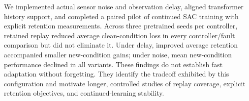 We implemented actual sensor noise and observation delay, aligned transformer history support, and completed a paired pilot of continued SAC training with explicit retention measurements. Across three pretrained seeds per controller, retained replay reduced average clean-condition loss in every controller/fault comparison but did not eliminate it. Under delay, improved average retention accompanied smaller new-condition gains; under noise, mean new-condition performance declined in all variants. These findings do not establish fast adaptation without forgetting. They identify the tradeoff exhibited by this configuration and motivate longer, controlled studies of replay coverage, explicit retention objectives, and continued-learning stability.
